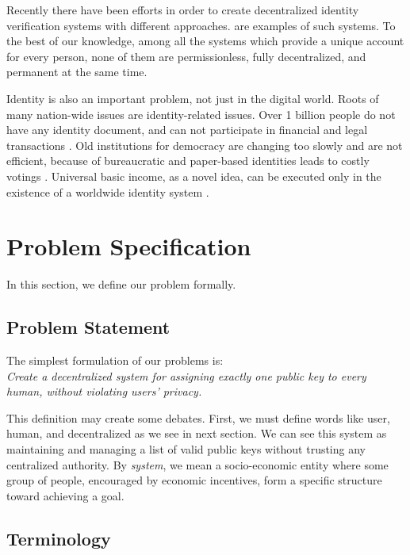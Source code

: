 \documentclass[conference]{IEEEtran}
\begin{document}
Recently there have been efforts in order to create decentralized identity verification systems with different approaches. \cite{proofofpersonhood, uport, sovrin} are examples of such systems. To the best of our knowledge, among all the systems which provide a unique account for every person, none of them are permissionless, fully decentralized, and permanent at the same time.


Identity is also an important problem, not just in the digital world. Roots of many nation-wide issues are identity-related issues. Over 1 billion people do not have any identity document, and can not participate in financial and legal transactions \cite{worldbankid}. Old institutions for democracy are changing too slowly and are not efficient, because of bureaucratic and paper-based identities leads to costly votings \cite{democracyearth}. Universal basic income, as a novel idea, can be executed only in the existence of a worldwide identity system \cite{basicincome}.




\section{ Problem Specification}
In this section, we define our problem formally.

\subsection{Problem Statement}
The simplest formulation of our problems is: \\
\textit{Create a decentralized system for assigning exactly one public key to every human, without violating users' privacy. }


This definition may create some debates. First, we must define words like user, human, and decentralized as we see in next section. We can see this system as maintaining and managing a list of valid public keys without trusting any centralized authority. By \textit{system}, we mean a socio-economic entity where some group of people, encouraged by economic incentives, form a specific structure toward achieving a goal. 

\subsection{Terminology}
\end{document}
